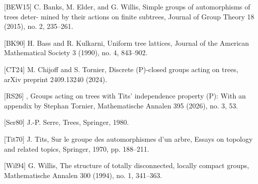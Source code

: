\documentclass[preview]{standalone}
\begin{document}
\begin{center}
[BEW15] C. Banks, M. Elder, and G. Willis, Simple groups of automorphisms of trees deter- mined by their actions on finite subtrees, Journal of Group Theory 18 (2015), no. 2, 235–261.
                        
                        [BK90] H. Bass and R. Kulkarni, Uniform tree lattices, Journal of the American Mathematical Society 3 (1990), no. 4, 843–902.

                        [CT24] M. Chijoff and S. Tornier, Discrete (P)-closed groups acting on trees, arXiv preprint 2409.13240 (2024).

                        [RS26] , Groups acting on trees with Tits’ independence property (P): With an appendix by Stephan Tornier, Mathematische Annalen 395 (2026), no. 3, 53.

                        [Ser80] J.-P. Serre, Trees, Springer, 1980.

                        [Tit70] J. Tits, Sur le groupe des automorphismes d’un arbre, Essays on topology and related topics, Springer, 1970, pp. 188–211.

                        [Wil94] G. Willis, The structure of totally disconnected, locally compact groups, Mathematische Annalen 300 (1994), no. 1, 341–363.
\end{center}
\end{document}
